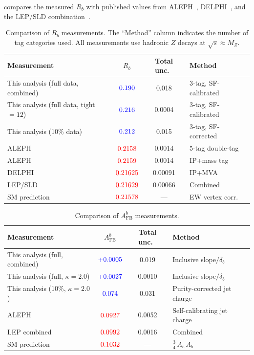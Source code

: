 \documentclass[11pt,a4paper]{article}
\newcommand{\measured}[1]{\textcolor{blue}{#1}}
\newcommand{\external}[1]{\textcolor{red}{#1}}
\begin{document}
 compares the measured $R_b$ with published
values from ALEPH~\cite{ALEPH:Rb:1996,ALEPH:Rb:precise},
DELPHI~\cite{DELPHI:Rb}, and the LEP/SLD
combination~\cite{LEP:EWWG:2005}.

\begin{table}[htbp]
\centering
\caption{Comparison of $R_b$ measurements. The ``Method'' column
indicates the number of tag categories used.
All measurements use hadronic $Z$ decays at $\sqrt{s} \approx M_Z$.}
\label{tbl:comparison_rb}
\begin{tabular}{lccl}
\toprule
Measurement & $R_b$ & Total unc.\ & Method \\
\midrule
This analysis (full data, combined) & $\measured{0.190}$ & 0.018 &
  3-tag, SF-calibrated \\
This analysis (full data, tight$=12$) & $\measured{0.216}$ & 0.0004 &
  3-tag, SF-calibrated \\
This analysis (10\% data) & $\measured{0.212}$ & 0.015 &
  3-tag, SF-corrected \\
ALEPH~\cite{ALEPH:Rb:1996} & $\external{0.2158}$ & 0.0014 &
  5-tag double-tag \\
ALEPH~\cite{ALEPH:Rb:precise} & $\external{0.2159}$ & 0.0014 &
  IP+mass tag \\
DELPHI~\cite{DELPHI:Rb} & $\external{0.21625}$ & 0.00091 &
  IP+MVA \\
LEP/SLD~\cite{LEP:EWWG:2005} & $\external{0.21629}$ & 0.00066 &
  Combined \\
SM prediction & $\external{0.21578}$ & --- & EW vertex corr.\ \\
\bottomrule
\end{tabular}
\end{table}

\begin{table}[htbp]
\centering
\caption{Comparison of $A_\text{FB}^b$ measurements.}
\label{tbl:comparison_afb}
\begin{tabular}{lccl}
\toprule
Measurement & $A_\text{FB}^b$ & Total unc.\ & Method \\
\midrule
This analysis (full, combined) & $\measured{+0.0005}$ & 0.019 &
  Inclusive slope$/\delta_b$ \\
This analysis (full, $\kappa=2.0$) & $\measured{+0.0027}$ & 0.0010 &
  Inclusive slope$/\delta_b$ \\
This analysis (10\%, $\kappa=2.0$) & $\measured{0.074}$ & 0.031 &
  Purity-corrected jet charge \\
ALEPH~\cite{ALEPH:AFBb} & $\external{0.0927}$ & 0.0052 &
  Self-calibrating jet charge \\
LEP combined~\cite{LEP:EWWG:2005} & $\external{0.0992}$ & 0.0016 &
  Combined \\
SM prediction & $\external{0.1032}$ & --- &
  $\frac{3}{4}\,A_e\,A_b$ \\
\bottomrule
\end{tabular}
\end{table}
\end{document}
